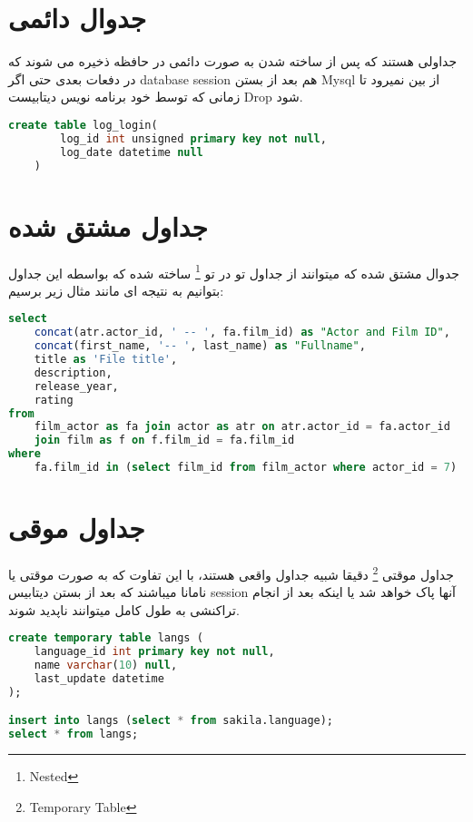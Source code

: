 \documentclass[20pt]{article}
\begin{document}
\tableofcontents
\newpage

\section{جدوال دائمی}

جداولی هستند که پس از ساخته شدن به صورت دائمی در حافظه ذخیره می شوند که در دفعات بعدی حتی اگر database session هم بعد از بستن Mysql از بین نمیرود تا زمانی که توسط خود برنامه نویس دیتابیست Drop شود.

\begin{LTR}
	\begin{lstlisting}[language=SQL, caption=SQL permenently table]
	create table log_login(
		log_id int unsigned primary key not null,
	    log_date datetime null	
	)
	\end{lstlisting}
\end{LTR}





\section{جداول مشتق شده }
جدوال مشتق شده که میتوانند از جداول تو در تو
\footnote{Nested}
ساخته شده که بواسطه این جداول بتوانیم به نتیجه ای مانند مثال زیر برسیم:

\begin{LTR}
	\begin{lstlisting}[language=SQL, caption=SQL Derived table]
select 
	concat(atr.actor_id, ' -- ', fa.film_id) as "Actor and Film ID",
    concat(first_name, '-- ', last_name) as "Fullname",
    title as 'File title',
    description,
    release_year,
    rating    
from 
	film_actor as fa join actor as atr on atr.actor_id = fa.actor_id
	join film as f on f.film_id = fa.film_id
where 
	fa.film_id in (select film_id from film_actor where actor_id = 7)
	\end{lstlisting}

\end{LTR}


\section{جداول موقی}
جداول موقتی \footnote{Temporary Table} دقیقا شبیه جداول واقعی هستند، با این تفاوت که به صورت موقتی یا نامانا میباشند که بعد از بستن دیتابیس session آنها پاک خواهد شد یا اینکه بعد از انجام تراکنشی به طول کامل میتوانند ناپدید شوند.

\begin{LTR}
\begin{lstlisting}[language=SQL, caption=SQL Temporary table]
create temporary table langs (
	language_id int primary key not null,
    name varchar(10) null,
    last_update datetime
);

insert into langs (select * from sakila.language);
select * from langs;

\end{lstlisting}
\end{LTR}
\end{document}
